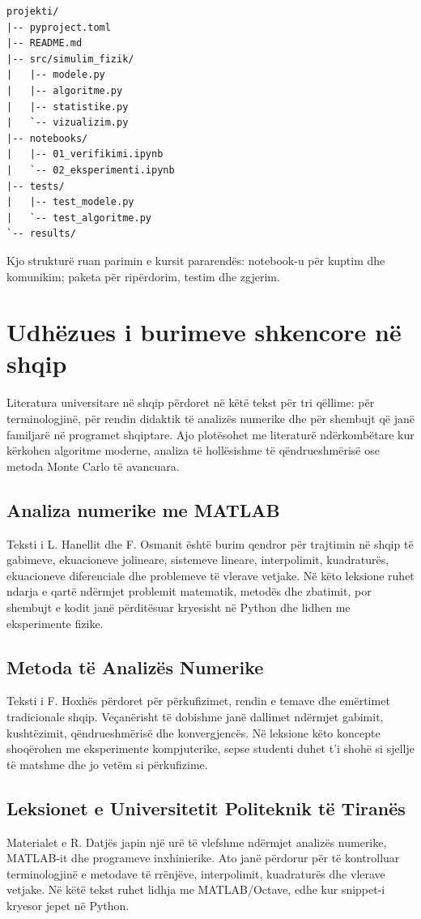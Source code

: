 \begin{lstlisting}[caption={Struktura e rekomanduar e paketës së studentit.}]
projekti/
|-- pyproject.toml
|-- README.md
|-- src/simulim_fizik/
|   |-- modele.py
|   |-- algoritme.py
|   |-- statistike.py
|   `-- vizualizim.py
|-- notebooks/
|   |-- 01_verifikimi.ipynb
|   `-- 02_eksperimenti.ipynb
|-- tests/
|   |-- test_modele.py
|   `-- test_algoritme.py
`-- results/
\end{lstlisting}

Kjo strukturë ruan parimin e kursit pararendës: notebook-u për kuptim dhe komunikim; paketa për ripërdorim, testim dhe zgjerim.

\section{Udhëzues i burimeve shkencore në shqip}
Literatura universitare në shqip përdoret në këtë tekst për tri qëllime: për terminologjinë, për rendin didaktik të analizës numerike dhe për shembujt që janë familjarë në programet shqiptare. Ajo plotësohet me literaturë ndërkombëtare kur kërkohen algoritme moderne, analiza të hollësishme të qëndrueshmërisë ose metoda Monte Carlo të avancuara.

\subsection{Analiza numerike me MATLAB}
Teksti i L. Hanellit dhe F. Osmanit \cite{hanelli} është burim qendror për trajtimin në shqip të gabimeve, ekuacioneve jolineare, sistemeve lineare, interpolimit, kuadraturës, ekuacioneve diferenciale dhe problemeve të vlerave vetjake. Në këto leksione ruhet ndarja e qartë ndërmjet problemit matematik, metodës dhe zbatimit, por shembujt e kodit janë përditësuar kryesisht në Python dhe lidhen me eksperimente fizike.

\subsection{Metoda të Analizës Numerike}
Teksti i F. Hoxhës \cite{hoxha} përdoret për përkufizimet, rendin e temave dhe emërtimet tradicionale shqip. Veçanërisht të dobishme janë dallimet ndërmjet gabimit, kushtëzimit, qëndrueshmërisë dhe konvergjencës. Në leksione këto koncepte shoqërohen me eksperimente kompjuterike, sepse studenti duhet t'i shohë si sjellje të matshme dhe jo vetëm si përkufizime.

\subsection{Leksionet e Universitetit Politeknik të Tiranës}
Materialet e R. Datjës \cite{datja} japin një urë të vlefshme ndërmjet analizës numerike, MATLAB-it dhe programeve inxhinierike. Ato janë përdorur për të kontrolluar terminologjinë e metodave të rrënjëve, interpolimit, kuadraturës dhe vlerave vetjake. Në këtë tekst ruhet lidhja me MATLAB/Octave, edhe kur snippet-i kryesor jepet në Python.

